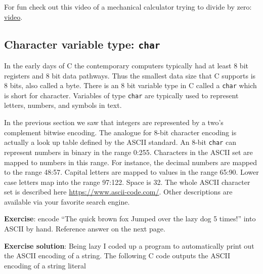 For fun check out this video of a mechanical calculator trying to divide by zero: \href{https://www.youtube.com/watch?v=7Kd3R_RlXgc}{video}.

\subsection{Character variable type: \texttt{char}}
In the early days of C the contemporary computers typically had at least 8 bit registers and 8 bit data pathways. Thus the smallest data size that C supports is 8 bits, also called a byte. There is an 8 bit variable type in C called a \texttt{char} which is short for character. Variables of type \texttt{char} are typically used to represent letters, numbers, and symbols in text. 

In the previous section we saw that integers are represented by a two's complement bitwise encoding. The analogue for 8-bit character encoding is actually a look up table defined by the ASCII standard. An 8-bit \texttt{char} can represent numbers in binary in the range 0:255. Characters in the ASCII set are mapped to numbers in this range. For instance, the decimal numbers are mapped to the range 48:57. Capital letters are mapped to values in the range 65:90. Lower case letters map into the range 97:122. Space is 32. The whole ASCII character set is described here \href{https://www.ascii-code.com/}{https://www.ascii-code.com/}. Other descriptions are available via your favorite search engine.

{\bf Exercise}: encode ``The quick brown fox Jumped over the lazy dog 5 times!'' into ASCII by hand. Reference answer on the next page.

\newpage
{\bf Exercise solution}: Being lazy I coded up a program to automatically print out the ASCII encoding of a string. The following C code outputs the ASCII encoding of a string literal

